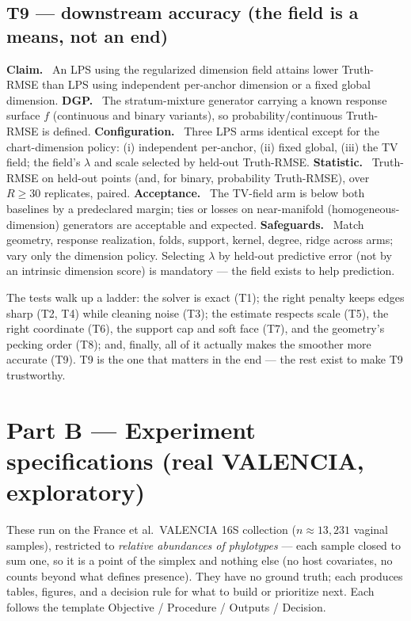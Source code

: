 \documentclass[11pt]{article}
\theoremstyle{definition}
\newcommand{\field}[1]{\smallskip\noindent\textbf{\textsf{#1.}}\ }
\begin{document}
\subsection{T9 --- downstream accuracy (the field is a means, not an end)}
\field{Claim} An LPS using the regularized dimension field attains lower
Truth-RMSE than LPS using independent per-anchor dimension or a fixed global
dimension.
\field{DGP} The stratum-mixture generator carrying a known response surface
$f$ (continuous and binary variants), so probability/continuous Truth-RMSE is
defined.
\field{Configuration} Three LPS arms identical except for the chart-dimension
policy: (i) independent per-anchor, (ii) fixed global, (iii) the TV field; the
field's $\lambda$ and scale selected by held-out Truth-RMSE.
\field{Statistic} Truth-RMSE on held-out points (and, for binary, probability
Truth-RMSE), over $R\ge 30$ replicates, paired.
\field{Acceptance} The TV-field arm is below both baselines by a predeclared
margin; ties or losses on near-manifold (homogeneous-dimension) generators are
acceptable and expected.
\field{Safeguards} Match geometry, response realization, folds, support, kernel,
degree, ridge across arms; vary only the dimension policy. Selecting $\lambda$ by
held-out predictive error (not by an intrinsic dimension score) is mandatory ---
the field exists to help prediction.

\begin{plain}
The tests walk up a ladder: the solver is exact (T1); the right penalty keeps
edges sharp (T2, T4) while cleaning noise (T3); the estimate respects scale (T5),
the right coordinate (T6), the support cap and soft face (T7), and the
geometry's pecking order (T8); and, finally, all of it actually makes the smoother
more accurate (T9). T9 is the one that matters in the end --- the rest exist to
make T9 trustworthy.
\end{plain}

\section{Part B --- Experiment specifications (real VALENCIA, exploratory)}
\label{sec:experiments}

These run on the France et al.\ VALENCIA 16S collection ($n\approx 13{,}231$
vaginal samples), restricted to \emph{relative abundances of phylotypes} --- each
sample closed to sum one, so it is a point of the simplex and nothing else
(no host covariates, no counts beyond what defines presence). They have no ground
truth; each produces tables, figures, and a decision rule for what to build or
prioritize next. Each follows the template \textsf{Objective / Procedure /
Outputs / Decision}.
\end{document}
